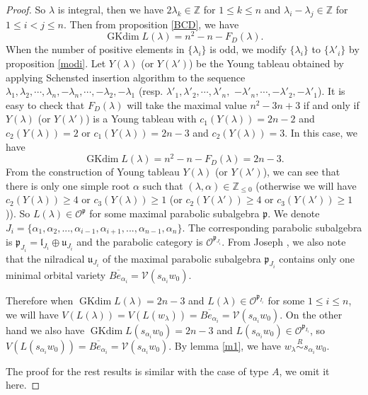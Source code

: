 \documentclass{amsart}[12pt]
\newcommand{\gkd}{\operatorname{GKdim}}
\numberwithin{equation}{section}
\begin{document}
\begin{proof}
So $\lambda$ is integral, then  we have  $2\lambda_k\in  \mathbb{Z}$ for $1\leq k\leq n $ and $\lambda_i-\lambda_j \in \mathbb{Z}$ for $1\leq i<j\leq n$.	
Then from proposition \ref{BCD}, we have
\[
\gkd L(\lambda)=n^2-n-F_D(\lambda).
\]
When the number of positive elements in $ \{\lambda_i \}$ is odd, we modify $ \{\lambda_i\} $ to $\{ \lambda'_i \}$ by proposition \ref{modi}.  Let $ Y(\lambda) $ (or $ Y(\lambda') $)  be the  Young tableau obtained by applying Schensted insertion algorithm to the sequence $
\lambda_1,\lambda_2,\cdots,\lambda_n,-\lambda_n,\cdots,-\lambda_2,-\lambda_1$ (resp. $\lambda'_1, \lambda'_2,\cdots,\lambda'_n,$ $-\lambda'_n,\cdots, -\lambda'_2, -\lambda'_1$).	
It is easy to check that $F_D(\lambda)$  will take the maximal value $n^2-3n+3$ if and only if $ Y(\lambda) $ (or $ Y(\lambda') $) is a Young tableau with $c_1(Y(\lambda))=2n-2$ and  $c_2(Y(\lambda))=2$ or $c_1(Y(\lambda))=2n-3$ and  $c_2(Y(\lambda))=3$. In this case, we have \[
\gkd L(\lambda)=n^2-n-F_D(\lambda)=2n-3.
\]
From the construction of Young tableau $Y(\lambda) $ (or $ Y(\lambda') $), we can see that there is only one simple root $\alpha$ such that $(\lambda,\alpha)\in \mathbb{Z}_{\leq 0}$ (otherwise we will have $c_2(Y(\lambda))\geq 4$ or $c_3(Y(\lambda))\geq 1$ (or $c_2(Y(\lambda'))\geq 4$ or $c_3(Y(\lambda'))\geq 1$)).  So $L(\lambda)\in \mathscr{O}^{\mathfrak{p}}$ for some maximal parabolic subalgebra $\mathfrak{p}$. We denote $J_i=\{\alpha_{1},\alpha_{2},...,\alpha_{i-1},\alpha_{i+1},...,\alpha_{n-1},\alpha_{n}\}$. The corresponding parabolic subalgebra is $\mathfrak{p}_{J_i}=\mathfrak{l}_{J_i}\oplus \mathfrak{u}_{J_i}$ and the parabolic category is  $\mathscr{O}^{\mathfrak{p}_{J_i}}$.
From Joseph \cite[Proposition 2.4]{Jo98}, we also note that the nilradical $\mathfrak{u}_{J_i}$ of the maximal parabolic subalgebra $\mathfrak{p}_{J_i}$  contains only one minimal orbital variety $\overline{Be_{\alpha_i}}=\mathcal{V}(s_{\alpha_i}w_0)$.

Therefore when $\gkd L(\lambda)=2n-3$ and $L(\lambda)\in \mathscr{O}^{\mathfrak{p}_{I_i}}$ for some $1\leq i\leq n$, we will have $V(L(\lambda))=V(L(w_{\lambda}))=\overline{Be_{\alpha_i}}=\mathcal{V}(s_{\alpha_i}w_0)$. On the other hand we also have $\gkd L(s_{\alpha_{i}}w_0)=2n-3$ and $L(s_{\alpha_{i}}w_0)\in \mathscr{O}^{\mathfrak{p}_{I_i}}$, so $V(L(s_{\alpha_{i}}w_0))=\overline{Be_{\alpha_i}}=\mathcal{V}(s_{\alpha_i}w_0)$. By lemma \ref{m1}, we have $w_{\lambda}\stackrel{R}{\sim}s_{\alpha_{i}}w_0$.


The proof for the rest results is similar with the case of type $A$, we omit it here.
\end{proof}
\end{document}
